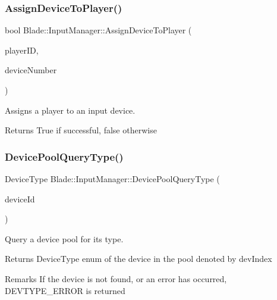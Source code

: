 \subsubsection{\texorpdfstring{Assign\+Device\+To\+Player()}{AssignDeviceToPlayer()}}
{\footnotesize\ttfamily bool Blade\+::\+Input\+Manager\+::\+Assign\+Device\+To\+Player (\begin{DoxyParamCaption}\item[{Joypad\+Number}]{player\+ID,  }\item[{int}]{device\+Number }\end{DoxyParamCaption})}



Assigns a player to an input device. 

\begin{DoxyReturn}{Returns}
True if successful, false otherwise 
\end{DoxyReturn}
\mbox{\label{class_blade_1_1_input_manager_a308a056833ddd9aa528ac4fbdbf9df4c}} 
\subsubsection{\texorpdfstring{Device\+Pool\+Query\+Type()}{DevicePoolQueryType()}}
{\footnotesize\ttfamily Device\+Type Blade\+::\+Input\+Manager\+::\+Device\+Pool\+Query\+Type (\begin{DoxyParamCaption}\item[{int}]{device\+Id }\end{DoxyParamCaption})}



Query a device pool for its type. 

\begin{DoxyReturn}{Returns}
Device\+Type enum of the device in the pool denoted by dev\+Index 
\end{DoxyReturn}
\begin{DoxyRemark}{Remarks}
If the device is not found, or an error has occurred, D\+E\+V\+T\+Y\+P\+E\+\_\+\+E\+R\+R\+OR is returned 
\end{DoxyRemark}
\mbox{\label{class_blade_1_1_input_manager_afdb7935349eacd9dab51a5b06c8d3864}} 
